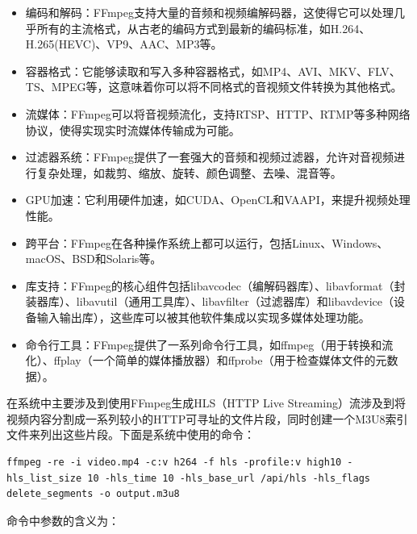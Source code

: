 \documentclass[main.tex]{subfiles}
\begin{document}
\begin{itemize}
    \item 编码和解码：FFmpeg支持大量的音频和视频编解码器，这使得它可以处理几乎所有的主流格式，从古老的编码方式到最新的编码标准，如H.264、H.265(HEVC)、VP9、AAC、MP3等。
    \item 容器格式：它能够读取和写入多种容器格式，如MP4、AVI、MKV、FLV、TS、MPEG等，这意味着你可以将不同格式的音视频文件转换为其他格式。
    \item 流媒体：FFmpeg可以将音视频流化，支持RTSP、HTTP、RTMP等多种网络协议，使得实现实时流媒体传输成为可能。
    \item 过滤器系统：FFmpeg提供了一套强大的音频和视频过滤器，允许对音视频进行复杂处理，如裁剪、缩放、旋转、颜色调整、去噪、混音等。
    \item GPU加速：它利用硬件加速，如CUDA、OpenCL和VAAPI，来提升视频处理性能。
    \item 跨平台：FFmpeg在各种操作系统上都可以运行，包括Linux、Windows、macOS、BSD和Solaris等。
    \item 库支持：FFmpeg的核心组件包括libavcodec（编解码器库）、libavformat（封装器库）、libavutil（通用工具库）、libavfilter（过滤器库）和libavdevice（设备输入输出库），这些库可以被其他软件集成以实现多媒体处理功能。
    \item 命令行工具：FFmpeg提供了一系列命令行工具，如ffmpeg（用于转换和流化）、ffplay（一个简单的媒体播放器）和ffprobe（用于检查媒体文件的元数据）。
\end{itemize}

在系统中主要涉及到使用FFmpeg生成HLS（HTTP Live Streaming）流涉及到将视频内容分割成一系列较小的HTTP可寻址的文件片段，同时创建一个M3U8索引文件来列出这些片段。下面是系统中使用的命令：

\begin{lstlisting}
ffmpeg -re -i video.mp4 -c:v h264 -f hls -profile:v high10 -hls_list_size 10 -hls_time 10 -hls_base_url /api/hls -hls_flags delete_segments -o output.m3u8
\end{lstlisting}

命令中参数的含义为：
\end{document}
